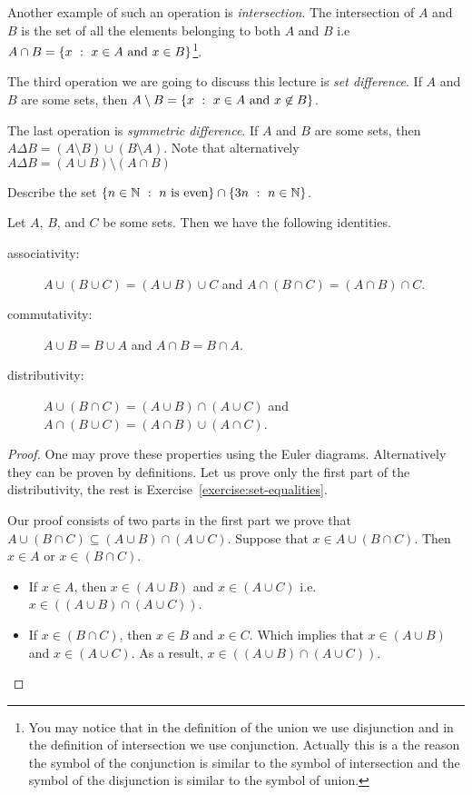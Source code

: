 Another example of such an operation is \textit{intersection}. The
intersection of $A$ and $B$ is the set of all the elements belonging to both
$A$ and $B$ i.e $A \cap B = \set[x \in A \text{ and } x \in B]{x}$\footnote{%
  You may notice that in the definition of the union we use disjunction and
  in the definition of intersection we use conjunction. Actually this is a the
  reason the symbol of the conjunction is similar to the symbol of intersection
  and the symbol of the disjunction is similar to the symbol of union.
}.

The third operation we are going to discuss this lecture is
\textit{set difference}. If $A$ and $B$ are some sets, then
$A \setminus B = \set[x \in A \text{ and } x \not\in B]{x}$.

The last operation is \textit{symmetric difference}. If $A$ and $B$ are some
sets, then $A \Delta B = (A \setminus B) \cup (B \setminus A)$. Note that
alternatively $A \Delta B = (A \cup B) \setminus (A \cap B)$

\begin{exercise}
  Describe the set
  $\set[n \text{ is even}]{n \in \N} \cap \set[n \in \N]{3n}$.
\end{exercise}

\begin{theorem}
\label{theorem:set-equalities}
  Let $A$, $B$, and $C$ be some sets. Then we have the following identities.
  \begin{description}
    \item[associativity:] $A \cup (B \cup C) = (A \cup B) \cup C$ and
      $A \cap (B \cap C) = (A \cap B) \cap C$.
    \item[commutativity:] $A \cup B = B \cup A$ and $A \cap B = B \cap A$.
    \item[distributivity:] $A \cup (B \cap C) = (A \cup B) \cap (A \cup C)$
      and $A \cap (B \cup C) = (A \cap B) \cup (A \cap C)$.
  \end{description}
\end{theorem}
\begin{proof}
  One may prove these properties using the Euler diagrams. Alternatively they
  can be proven by definitions. Let us prove only the first part of the
  distributivity, the rest is Exercise~\ref{exercise:set-equalities}.

  Our proof consists of two parts in the first part we prove that
  $A \cup (B \cap C) \subseteq (A \cup B) \cap (A \cup C)$.
  Suppose that $x \in A \cup (B \cap C)$. Then $x \in A$ or $x \in (B \cap C)$.
  \begin{itemize}
    \item If $x \in A$, then $x \in (A \cup B)$ and $x \in (A \cup C)$ i.e.
      $x \in ((A \cup B) \cap (A \cup C))$.
    \item If $x \in (B \cap C)$, then $x \in B$ and $x \in C$. Which implies
      that $x \in (A \cup B)$ and $x \in (A \cup C)$. As a result,
      $x \in ((A \cup B) \cap (A \cup C))$.
  \end{itemize}
\end{proof}

